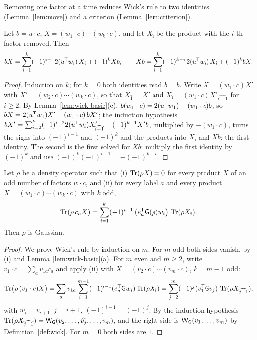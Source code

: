 Removing one factor at a time reduces Wick's rule to two identities
(Lemma~\ref{lem:move}) and a criterion (Lemma~\ref{lem:criterion}).

\begin{lemma}\label{lem:move}
Let $b=u\cdot c$, $X=(w_1\cdot c)\cdots(w_k\cdot c)$, and let $X_{\hat\imath}$ be the product
with the $i$-th factor removed. Then
\[
 bX=\sum_{i=1}^k(-1)^{i-1}\,2(u^{\mathsf T}w_i)\,X_{\hat\imath}+(-1)^kXb,\qquad
 Xb=\sum_{i=1}^k(-1)^{k-i}\,2(u^{\mathsf T}w_i)\,X_{\hat\imath}+(-1)^kbX.
\]
\end{lemma}
\begin{proof}
Induction on $k$; for $k=0$ both identities read $b=b$. Write $X=(w_1\cdot c)X'$ with
$X'=(w_2\cdot c)\cdots(w_k\cdot c)$, so that $X_{\hat1}=X'$ and
$X_{\hat\imath}=(w_1\cdot c)X'_{\widehat{i-1}}$ for $i\geq2$. By Lemma~\ref{lem:wick-basic}(c),
$b(w_1\cdot c)=2(u^{\mathsf T}w_1)-(w_1\cdot c)b$, so $bX=2(u^{\mathsf T}w_1)X'-(w_1\cdot c)\,bX'$; the
induction hypothesis $bX'=\sum_{i=2}^k(-1)^{i-2}2(u^{\mathsf T}w_i)X'_{\widehat{i-1}}+(-1)^{k-1}X'b$,
multiplied by $-(w_1\cdot c)$, turns the signs into $(-1)^{i-1}$ and $(-1)^k$ and the products
into $X_{\hat\imath}$ and $Xb$: the first identity. The second is the first solved for $Xb$:
multiply the first identity by $(-1)^k$ and use $(-1)^k(-1)^{i-1}=-(-1)^{k-i}$.
\end{proof}

\begin{lemma}\label{lem:criterion}
Let $\rho$ be a density operator such that (i) $\operatorname{Tr}(\rho X)=0$ for every product $X$ of an odd
number of factors $w\cdot c$, and (ii) for every label $a$ and every product
$X=(w_1\cdot c)\cdots(w_k\cdot c)$ with $k$ odd,
\[
 \operatorname{Tr}(\rho\,c_aX)=\sum_{i=1}^k(-1)^{i-1}\,\bigl(e_a^{\mathsf T}\mathsf G(\rho)w_i\bigr)\,\operatorname{Tr}(\rho X_{\hat\imath}).
\]
Then $\rho$ is Gaussian.
\end{lemma}
\begin{proof}
We prove Wick's rule by induction on $m$. For $m$ odd both sides vanish, by (i) and
Lemma~\ref{lem:wick-basic}(a). For $m$ even and $m\geq2$, write $v_1\cdot c=\sum_av_{1a}c_a$
and apply (ii) with $X=(v_2\cdot c)\cdots(v_m\cdot c)$, $k=m-1$ odd:
\[
 \operatorname{Tr}\bigl(\rho\,(v_1\cdot c)X\bigr)=\sum_av_{1a}\sum_{i=1}^{m-1}(-1)^{i-1}(e_a^{\mathsf T}\mathsf G w_i)
 \operatorname{Tr}(\rho X_{\hat\imath})=\sum_{j=2}^m(-1)^j(v_1^{\mathsf T}\mathsf G v_j)\,\operatorname{Tr}(\rho X_{\widehat{j-1}}),
\]
with $w_i=v_{i+1}$, $j=i+1$, $(-1)^{i-1}=(-1)^j$. By the induction hypothesis
$\operatorname{Tr}(\rho X_{\widehat{j-1}})=\mathsf W_\mathsf G(v_2,\ldots,\widehat{v_j},\ldots,v_m)$, and the right side is
$\mathsf W_\mathsf G(v_1,\ldots,v_m)$ by Definition~\ref{def:wick}. For $m=0$ both sides are $1$.
\end{proof}


